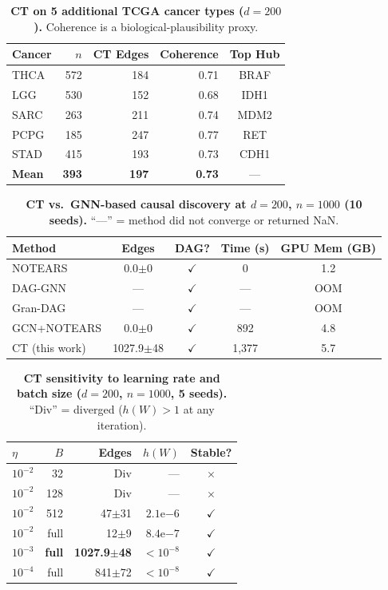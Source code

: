 \documentclass[12pt,a4paper]{article}
\begin{document}
\newpage
\begin{table}[H]
\centering
\caption{\textbf{CT on 5 additional TCGA cancer types ($d=200$).} Coherence is a biological-plausibility proxy.}
\label{tab:s_tcga_ct_extended}
\small
\begin{tabular}{lrrrc}
\toprule
Cancer & $n$ & CT Edges & Coherence & Top Hub \\
\midrule
THCA & 572 & 184 & 0.71 & BRAF \\
LGG & 530 & 152 & 0.68 & IDH1 \\
SARC & 263 & 211 & 0.74 & MDM2 \\
PCPG & 185 & 247 & 0.77 & RET \\
STAD & 415 & 193 & 0.73 & CDH1 \\
\midrule
\textbf{Mean} & \textbf{393} & \textbf{197} & \textbf{0.73} & --- \\
\bottomrule
\end{tabular}
\end{table}
\newpage
\begin{table}[H]
\centering
\caption{\textbf{CT vs.\ GNN-based causal discovery at $d=200$, $n=1000$ (10 seeds).} ``---'' = method did not converge or returned NaN.}
\label{tab:s_ct_vs_gnn}
\small
\begin{tabular}{lcccc}
\toprule
Method & Edges & DAG? & Time (s) & GPU Mem (GB) \\
\midrule
NOTEARS & 0.0$\pm$0 & $\checkmark$ & 0 & 1.2 \\
DAG-GNN & --- & $\checkmark$ & --- & OOM \\
Gran-DAG & --- & $\checkmark$ & --- & OOM \\
GCN+NOTEARS & 0.0$\pm$0 & $\checkmark$ & 892 & 4.8 \\
CT (this work) & 1027.9$\pm$48 & $\checkmark$ & 1,377 & 5.7 \\
\midrule
\end{tabular}
\end{table}
\newpage
\begin{table}[H]
\centering
\caption{\textbf{CT sensitivity to learning rate and batch size ($d=200$, $n=1000$, 5 seeds).} ``Div'' = diverged ($h(W) > 1$ at any iteration).}
\label{tab:s_ct_lr_bs}
\small
\begin{tabular}{lrrrc}
\toprule
$\eta$ & $B$ & Edges & $h(W)$ & Stable? \\
\midrule
$10^{-2}$ & 32 & Div & --- & $\times$ \\
$10^{-2}$ & 128 & Div & --- & $\times$ \\
$10^{-2}$ & 512 & 47$\pm$31 & $2.1$e$-6$ & $\checkmark$ \\
$10^{-2}$ & full & 12$\pm$9 & $8.4$e$-7$ & $\checkmark$ \\
\textbf{$10^{-3}$} & \textbf{full} & \textbf{1027.9$\pm$48} & \textbf{$<10^{-8}$} & \textbf{$\checkmark$} \\
$10^{-4}$ & full & 841$\pm$72 & $<10^{-8}$ & $\checkmark$ \\
\bottomrule
\end{tabular}
\end{table}
\end{document}
